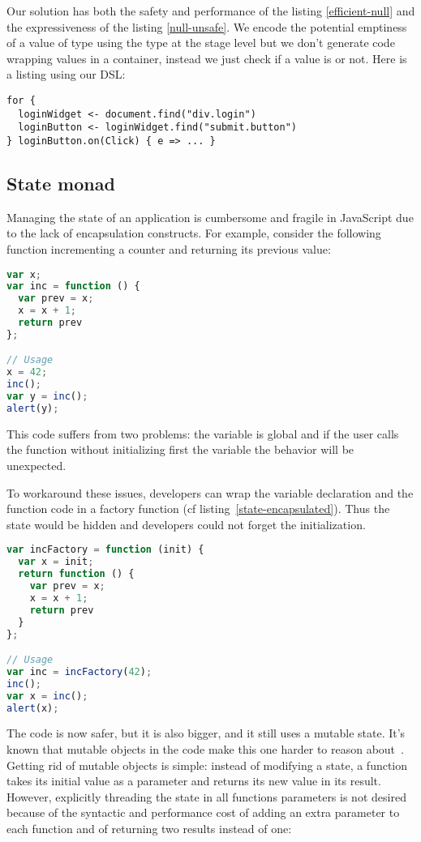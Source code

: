 \documentclass[american,english,runningheads]{llncs}
\begin{document}
Our solution has both the safety and performance of the listing \ref{efficient-null} and the expressiveness of the listing \ref{null-unsafe}. We encode the potential emptiness of a value of type  using the  type at the stage level but we don’t generate code wrapping values in a container, instead we just check if a value is  or not. Here is a listing using our DSL:

\begin{lstlisting}
for {
  loginWidget <- document.find("div.login")
  loginButton <- loginWidget.find("submit.button")
} loginButton.on(Click) { e => ... }
\end{lstlisting}

\subsection{State monad}

Managing the state of an application is cumbersome and fragile in JavaScript due to the lack of encapsulation constructs. For example, consider the following function incrementing a counter and returning its previous value:
\begin{lstlisting}[language=JavaScript,label=state-fragile,caption=Fragile state handling]
var x;
var inc = function () {
  var prev = x;
  x = x + 1;
  return prev
};

// Usage
x = 42;
inc();
var y = inc();
alert(y);
\end{lstlisting}
This code suffers from two problems: the variable  is global and if the user calls the  function without initializing first the  variable the behavior will be unexpected.

To workaround these issues, developers can wrap the variable declaration and the  function code in a factory function (cf listing~\ref{state-encapsulated}). Thus the state would be hidden and developers could not forget the initialization.

\begin{lstlisting}[language=JavaScript,label=state-encapsulated,caption=State encapsulation within a function]
var incFactory = function (init) {
  var x = init;
  return function () {
    var prev = x;
    x = x + 1;
    return prev
  }
};

// Usage
var inc = incFactory(42);
inc();
var x = inc();
alert(x);
\end{lstlisting}

The code is now safer, but it is also bigger, and it still uses a mutable state. It’s known that mutable objects in the code make this one harder to reason about~\cite{Grogono94_Immutability}. Getting rid of mutable objects is simple: instead of modifying a state, a function takes its initial value as a parameter and returns its new value in its result. However, explicitly threading the state in all functions parameters is not desired because of the syntactic and performance cost of adding an extra parameter to each function and of returning two results instead of one:
\end{document}
